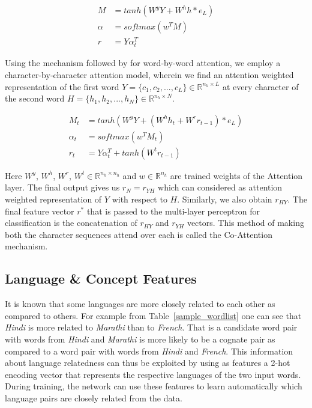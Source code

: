 \documentclass[11pt,letterpaper]{article}
\begin{document}
\begin{align}
M &= tanh(W^yY + W^hh*e_L) \\
\alpha &= softmax(w^TM) \\
r &= Y\alpha_t^T
\end{align}

Using the mechanism followed by \cite{rocktaschel2016reasoning} for word-by-word attention, we employ a character-by-character attention model, wherein we find an attention weighted representation of the first word $Y = \{c_1, c_2, ..., c_L\} \in \mathbb{R}^{n_h \times L}$ at every character of the second word $H = \{h_1, h_2, ..., h_N\} \in \mathbb{R}^{n_h \times N}$.

\begin{align}
M_t &= tanh(W^yY + (W^hh_t + W^rr_{t-1})*e_L) \\
\alpha_t &= softmax(w^TM_t) \\
r_t &= Y\alpha_t^T + tanh(W^tr_{t-1})
\end{align}

Here $W^y$, $W^h$, $W^r$, $W^t \in  \mathbb{R}^{n_h \times n_h}$ and $w \in \mathbb{R}^{n_h}$ are trained weights of the Attention layer. The final output gives us $r_N = r_{YH}$ which can considered as attention weighted representation of $Y$ with respect to $H$. Similarly, we also obtain $r_{HY}$. The final feature vector $r^*$ that is passed to the multi-layer perceptron for classification is the concatenation of $r_{HY}$ and $r_{YH}$ vectors. This method of making both the character sequences attend over each is called the Co-Attention mechanism.
 
\subsection{Language \& Concept Features}

It is known that some languages are more closely related to each other as compared to others. For example from Table~\ref{sample_wordlist} one can see that \textit{Hindi} is more related to \textit{Marathi} than to \textit{French}. That is a candidate word pair with words from \textit{Hindi} and \textit{Marathi} is more likely to be a cognate pair as compared to a word pair with words from \textit{Hindi} and \textit{French}. This information about language relatedness can thus be exploited by using as features a 2-hot encoding vector that represents the respective languages of the two input words. During training, the network can use these features to learn automatically which language pairs are closely related from the data.
\end{document}
